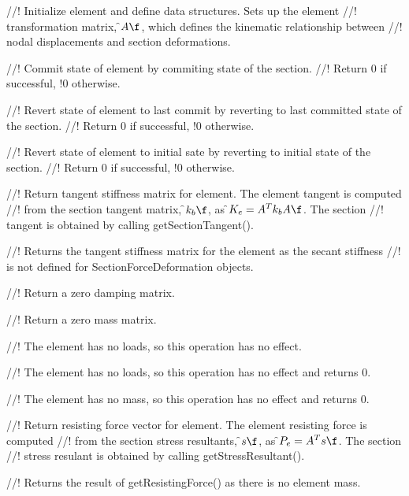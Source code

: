 //! Initialize element and define data structures.  Sets up the element
//! transformation matrix, \f$A\f$, which defines the kinematic relationship between
//! nodal displacements and section deformations.


//! Commit state of element by commiting state of the section.
//! Return 0 if successful, !0 otherwise.


//! Revert state of element to last commit by reverting to last committed state of the section.
//! Return 0 if successful, !0 otherwise.


//! Revert state of element to initial sate by reverting to initial state of the section.
//! Return 0 if successful, !0 otherwise.


//! Return tangent stiffness matrix for element.  The element tangent is computed
//! from the section tangent matrix, \f$k_b\f$, as \f$K_e = A^T k_b A\f$.  The section
//! tangent is obtained by calling getSectionTangent().


//! Returns the tangent stiffness matrix for the element as the secant stiffness
//! is not defined for SectionForceDeformation objects.


//! Return a zero damping matrix.


//! Return a zero mass matrix.


//! The element has no loads, so this operation has no effect.


//! The element has no loads, so this operation has no effect and returns 0.


//! The element has no mass, so this operation has no effect and returns 0.


//! Return resisting force vector for element.  The element resisting force is computed
//! from the section stress resultants, \f$s\f$, as \f$P_e = A^T s\f$.  The section
//! stress resulant is obtained by calling getStressResultant().


//! Returns the result of getResistingForce() as there is no element mass.


